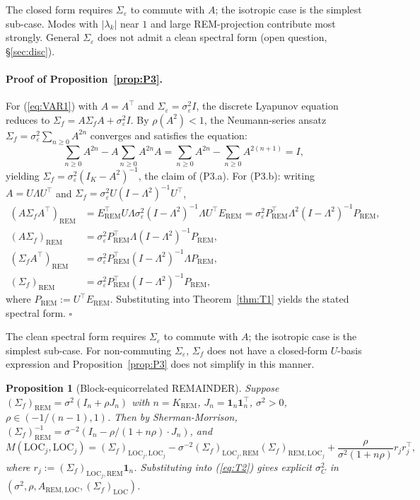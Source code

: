\documentclass[11pt,letterpaper]{article}
\newtheorem{proposition}{Proposition}
\theoremstyle{remark}
\newcommand{\REM}{\mathrm{REM}}
\newcommand{\LOC}{\mathrm{LOC}}
\newcommand{\Sigmaf}{\Sigma_f}
\newcommand{\Sigmae}{\Sigma_\varepsilon}
\begin{document}
The closed form requires $\Sigmae$ to commute with $A$; the isotropic case is the simplest sub-case. Modes with $|\lambda_k|$ near $1$ and large REM-projection contribute most strongly. General $\Sigmae$ does not admit a clean spectral form (open question, \S\ref{sec:disc}).

\paragraph{Proof of Proposition~\ref{prop:P3}.} For (\ref{eq:VAR1}) with $A = A^\top$ and $\Sigmae = \sigma_\varepsilon^2 I$, the discrete Lyapunov equation reduces to $\Sigmaf = A \Sigmaf A + \sigma_\varepsilon^2 I$. By $\rho(A^2) < 1$, the Neumann-series ansatz $\Sigmaf = \sigma_\varepsilon^2 \sum_{n \ge 0} A^{2n}$ converges and satisfies the equation:
\begin{equation*}
\sum_{n \ge 0} A^{2n} - A \sum_{n \ge 0} A^{2n} A = \sum_{n \ge 0} A^{2n} - \sum_{n \ge 0} A^{2(n+1)} = I,
\end{equation*}
yielding $\Sigmaf = \sigma_\varepsilon^2 (I_K - A^2)^{-1}$, the claim of (P3.a). For (P3.b): writing $A = U \Lambda U^\top$ and $\Sigmaf = \sigma_\varepsilon^2 U (I - \Lambda^2)^{-1} U^\top$,
\begin{align*}
(A \Sigmaf A^\top)_\REM &= E_\REM^\top U \Lambda \sigma_\varepsilon^2 (I - \Lambda^2)^{-1} \Lambda U^\top E_\REM = \sigma_\varepsilon^2 P_\REM^\top \Lambda^2 (I - \Lambda^2)^{-1} P_\REM, \\
(A \Sigmaf)_\REM &= \sigma_\varepsilon^2 P_\REM^\top \Lambda (I - \Lambda^2)^{-1} P_\REM, \\
(\Sigmaf A^\top)_\REM &= \sigma_\varepsilon^2 P_\REM^\top (I - \Lambda^2)^{-1} \Lambda P_\REM, \\
(\Sigmaf)_\REM &= \sigma_\varepsilon^2 P_\REM^\top (I - \Lambda^2)^{-1} P_\REM,
\end{align*}
where $P_\REM := U^\top E_\REM$. Substituting into Theorem~\ref{thm:T1} yields the stated spectral form. $\square$

The clean spectral form requires $\Sigmae$ to commute with $A$; the isotropic case is the simplest sub-case. For non-commuting $\Sigmae$, $\Sigmaf$ does not have a closed-form $U$-basis expression and Proposition~\ref{prop:P3} does not simplify in this manner.

\begin{proposition}[Block-equicorrelated REMAINDER]\label{prop:P4}
Suppose $(\Sigmaf)_\REM = \sigma^2 (I_n + \rho J_n)$ with $n = K_\REM$, $J_n = \mathbf{1}_n \mathbf{1}_n^\top$, $\sigma^2 > 0$, $\rho \in (-1/(n-1), 1)$. Then by Sherman-Morrison, $(\Sigmaf)_\REM^{-1} = \sigma^{-2} (I_n - \rho/(1 + n\rho) \cdot J_n)$, and
\begin{equation*}
M(\LOC_j, \LOC_j) = (\Sigmaf)_{\LOC_j, \LOC_j} - \sigma^{-2} (\Sigmaf)_{\LOC_j, \REM} (\Sigmaf)_{\REM, \LOC_j} + \frac{\rho}{\sigma^2 (1 + n\rho)} r_j r_j^\top,
\end{equation*}
where $r_j := (\Sigmaf)_{\LOC_j, \REM} \mathbf{1}_n$. Substituting into (\ref{eq:T2}) gives explicit $\sigma^2_C$ in $(\sigma^2, \rho, A_{\REM, \LOC}, (\Sigmaf)_\LOC)$.
\end{proposition}
\end{document}
